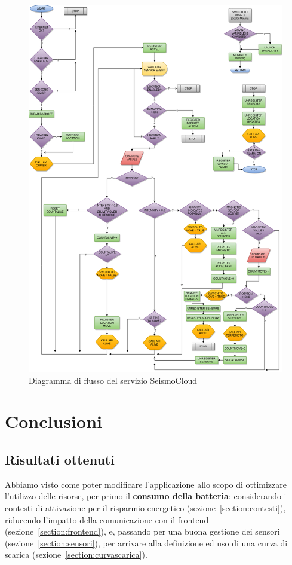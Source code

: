 \documentclass[a4paper,10pt]{memoir}
\begin{document}
\begin{figure}[ht]
\centering
\caption{Diagramma di flusso del servizio SeismoCloud}
\label{fig:serviceflowdiagram}
\includegraphics[width=\textwidth]{SeismoCloud_flowdiag}
\end{figure}

\chapter{Conclusioni}

\section{Risultati ottenuti}

Abbiamo visto come poter modificare l'applicazione allo scopo di ottimizzare l'utilizzo delle risorse, per primo il \textbf{consumo della batteria}: considerando i contesti di attivazione per il risparmio energetico (sezione~\ref{section:contesti}), riducendo l'impatto della comunicazione con il frontend (sezione~\ref{section:frontend}), e, passando per una buona gestione dei sensori (sezione~\ref{section:sensori}), per arrivare alla definizione ed uso di una curva di scarica (sezione~\ref{section:curvascarica}).
\end{document}
